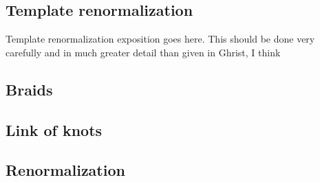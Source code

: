\documentclass[paper.tex]{subfiles}
\begin{document}
\subsection{Template renormalization}
Template renormalization exposition goes here. This should be done very carefully and in much greater detail than given in Ghrist, I think

\subsection{Braids}

\subsection{Link of knots}

\subsection{Renormalization}
\end{document}
